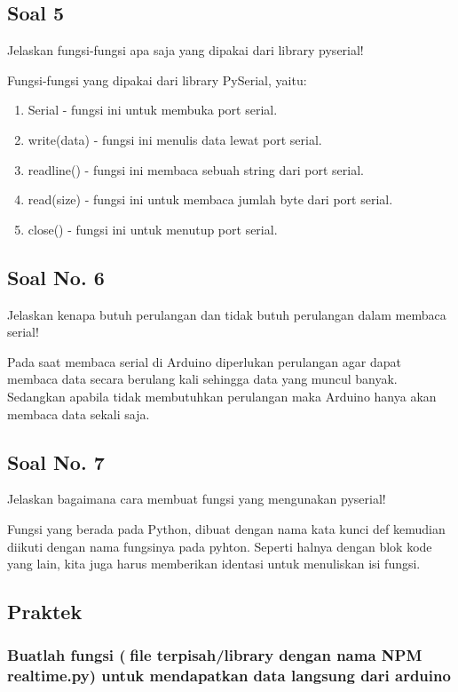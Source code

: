 \subsection{Soal 5}
Jelaskan fungsi-fungsi apa saja yang dipakai dari library pyserial!

\hfill \break
Fungsi-fungsi yang dipakai dari library PySerial, yaitu:
\begin{enumerate}
	\item Serial - fungsi ini untuk membuka port serial.
	\item write(data) - fungsi ini menulis data lewat port serial.
	\item readline() - fungsi ini membaca sebuah string dari port serial.
	\item read(size) - fungsi ini untuk membaca jumlah byte dari port serial.
	\item close() - fungsi ini untuk menutup port serial.
\end{enumerate}

\subsection{Soal No. 6}
Jelaskan kenapa butuh perulangan dan tidak butuh perulangan dalam membaca serial!

\hfill \break
Pada saat membaca serial di Arduino diperlukan perulangan agar dapat membaca data secara berulang kali sehingga data yang muncul banyak. Sedangkan apabila tidak membutuhkan perulangan maka Arduino hanya akan membaca data sekali saja.

\subsection{Soal No. 7}
Jelaskan bagaimana cara membuat fungsi yang mengunakan pyserial!

\hfill \break
Fungsi yang berada pada Python, dibuat dengan nama kata kunci def kemudian diikuti dengan nama fungsinya pada pyhton.
Seperti halnya dengan blok kode yang lain, kita juga harus memberikan identasi untuk menuliskan isi fungsi.


\subsection{Praktek}
\subsubsection{Buatlah fungsi (file terpisah/library dengan nama NPM realtime.py) untuk mendapatkan data langsung dari arduino}


